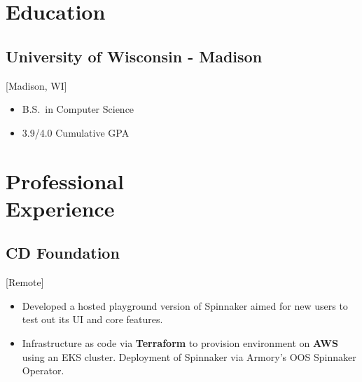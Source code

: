 \documentclass{mycv}
\begin{document}
\maketitle
\section{Education}
\subsection{University of Wisconsin - Madison}[Madison, WI]
\begin{itemize}[label={}]
  \item B.S.\ in Computer Science 
  \item 3.9/4.0 Cumulative GPA
\end{itemize}
\section{Professional \\ Experience}
\subsection{CD Foundation}[Remote]
\begin{positions}
\end{positions}
\begin{itemize}
  \item {
    Developed a hosted playground version of Spinnaker aimed for new users to test out its UI and core features.
  }
 \item{
 Infrastructure as code via \textbf{Terraform} to provision environment on \textbf{AWS} using an EKS cluster. Deployment of Spinnaker via Armory's OOS Spinnaker Operator.
 }
 \end{itemize}
 
\end{document}
